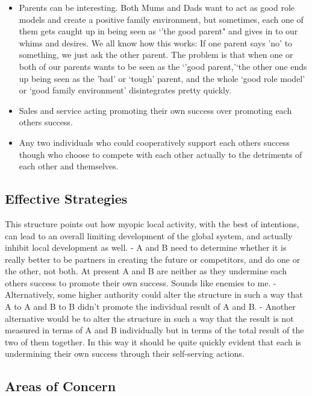 \documentclass[]{memoir}
\begin{document}
\begin{itemize}
\itemsep1pt\parskip0pt
\item
  Parents can be interesting. Both Mums and Dads want to act as good
  role models and create a positive family environment, but sometimes,
  each one of them gets caught up in being seen as `'the good parent"
  and gives in to our whims and desires. We all know how this works: If
  one parent says 'no' to something, we just ask the other parent. The
  problem is that when one or both of our parents wants to be seen as
  the `'good parent,'`the other one ends up being seen as the 'bad' or
  `tough' parent, and the whole `good role model' or `good family
  environment' disintegrates pretty quickly.
\item
  Sales and service acting promoting their own success over promoting
  each others success.
\item
  Any two individuals who could cooperatively support each others
  success though who choose to compete with each other actually to the
  detriments of each other and themselves.
\end{itemize}

\subsection{Effective Strategies}

This structure points out how myopic local activity, with the best of
intentions, can lead to an overall limiting development of the global
system, and actually inhibit local development as well. - A and B need
to determine whether it is really better to be partners in creating the
future or competitors, and do one or the other, not both. At present A
and B are neither as they undermine each others success to promote their
own success. Sounds like enemies to me. - Alternatively, some higher
authority could alter the structure in such a way that A to A and B to B
didn't promote the individual result of A and B. - Another alternative
would be to alter the structure in such a way that the result is not
measured in terms of A and B individually but in terms of the total
result of the two of them together. In this way it should be quite
quickly evident that each is undermining their own success through their
self-serving actions.

\subsection{Areas of Concern}
\end{document}
